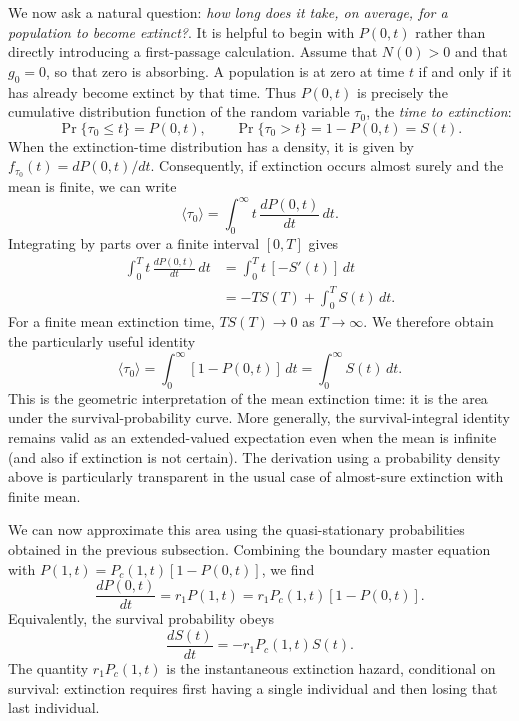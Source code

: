We now ask a natural question: \emph{how long does it take, on average,
for a population to become extinct?}. It is
helpful to begin with $P(0,t)$ rather than directly introducing a first-passage calculation. Assume that $N(0)>0$ and that $g_0=0$, so that zero is absorbing. A population is at zero at time $t$ if and only if it has already become extinct by that time. Thus $P(0,t)$ is precisely the cumulative distribution function of the random variable
$\tau_0$, the \emph{time to extinction}:
\begin{equation}
 \Pr\{\tau_0\leq t\}=P(0,t),
 \qquad \Pr\{\tau_0>t\}=1-P(0,t)=S(t).
 \label{eq:ext-cdf-time}
\end{equation}
When the extinction-time distribution has a density, it is given by
$f_{\tau_0}(t)=dP(0,t)/dt$. Consequently, if extinction occurs almost
surely and the mean is finite, we can write
\begin{equation}
 \langle \tau_0\rangle
 =\int_0^\infty t\,\frac{dP(0,t)}{dt}\,dt.
 \label{eq:ext-mean-cdf-density}
\end{equation}
Integrating by parts over a finite interval $[0,T]$ gives
\begin{align}
 \int_0^T t\,\frac{dP(0,t)}{dt}\,dt
 &=\int_0^T t\,[-S'(t)]\,dt\\
 &=-T S(T)+\int_0^T S(t)\,dt.
 \label{eq:ext-parts-finite}
\end{align}
For a finite mean extinction time, $T S(T)\to0$ as $T\to\infty$.
We therefore obtain the particularly useful identity
\begin{equation}
 \boxed{\langle \tau_0\rangle
   =\int_0^\infty [1-P(0,t)]\,dt
   =\int_0^\infty S(t)\,dt.}
 \label{eq:ext-survival-integral}
\end{equation}
This is the geometric interpretation of the mean extinction time:
it is the area under the survival-probability curve. More generally,
the survival-integral identity remains valid as an extended-valued
expectation even when the mean is infinite (and also if extinction
is not certain). The derivation using a probability density above
is particularly transparent in the usual case of almost-sure
extinction with finite mean.
\smallskip

We can now approximate this area using the quasi-stationary
probabilities obtained in the previous subsection. Combining the
boundary master equation with $P(1,t)=P_c(1,t)[1-P(0,t)]$, we find
\begin{equation}
 \frac{dP(0,t)}{dt}
 =r_1P(1,t)
 =r_1P_c(1,t)[1-P(0,t)].
 \label{eq:ext-hazard-p0}
\end{equation}
Equivalently, the survival probability obeys
\begin{equation}
 \boxed{\frac{dS(t)}{dt}=-r_1P_c(1,t)S(t).}
 \label{eq:ext-hazard}
\end{equation}
The quantity $r_1P_c(1,t)$ is the instantaneous extinction hazard,
conditional on survival: extinction requires first having a single
individual and then losing that last individual.

